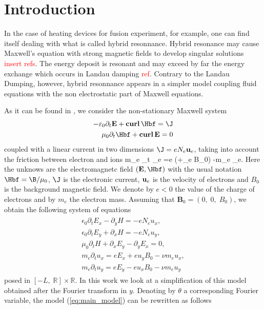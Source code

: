 
\section{Introduction}
In the case of heating devices for fusion experiment, for example, 
 one can find itself dealing with what is called hybrid resonnance. 
 Hybrid resonance may cause Maxwell's equation with strong magnetic 
 fields to develop singular solutions \textcolor{red}{insert refs}. 
 The energy deposit is resonant and may exceed by far the energy 
 exchange which occurs in Landau damping \textcolor{red}{ref}. 
 Contrary to the Landau Dumping, however, 
 hybrid resonnance appears in a simpler model coupling 
 fluid equations with the non electrostatic part of Maxwell equations.
 
 
 As it can be found in \cite{stable_yee_plasma_current}, we consider the non-stationary Maxwell system  
 \begin{align}
-\varepsilon_0 \partial_t \E + \curl\, \Hbf = \J\\
\mu_0 \partial_t \Hbf + \curl\, \E = 0
\end{align}
coupled with a linear current in two dimensions $\J = eN_e \ubf_e$, taking into account the friction between electron and ions
\be
m_e \partial_t \ubf_e =e (\E +\ubf_e \nabla B_0) -m_e \nu \ubf_e. \label{eq:electronmove}
\ee
Here the unknows are the electromagnetc field $(\E,\Hbf)$ with the usual notation $\Hbf = \B/\mu_0$, $\J$ is the electronic current, 
${\bf u}_e$ is the velocity of electrons and $B_0$ is the background magnetic field.  
We denote by $e<0$ the value of the charge of electrons and by $m_e$ the electron mass.
Assuming that $\mathbf{B}_0=\left(0,\; 0,\; B_0\right)$, we obtain the following system of equations 
\begin{align}
\label{eq:main_model}
\begin{split}
\epsilon_0\partial_t E_{x}-\partial_y H=-eN_e u_x,\\
\epsilon_0\partial_t E_{y}+\partial_x H=-eN_e u_y,\\
\mu_0\partial_t H+\partial_x E_y-\partial_y E_x=0,\\
m_e\partial_t u_x=eE_x+eu_yB_0-\nu m_e u_x,\\
m_e\partial_t u_y=eE_y-eu_xB_0-\nu m_e u_y
\end{split}
\end{align}
posed in $[-L,\; \mathbb{R}]\times \mathbb{R}$. 
In this work we look at a simplification of this model obtained after 
the Fourier transform in $y$. Denoting by $\theta$ a corresponding Fourier variable, the model (\ref{eq:main_model}) can be rewritten as follows

